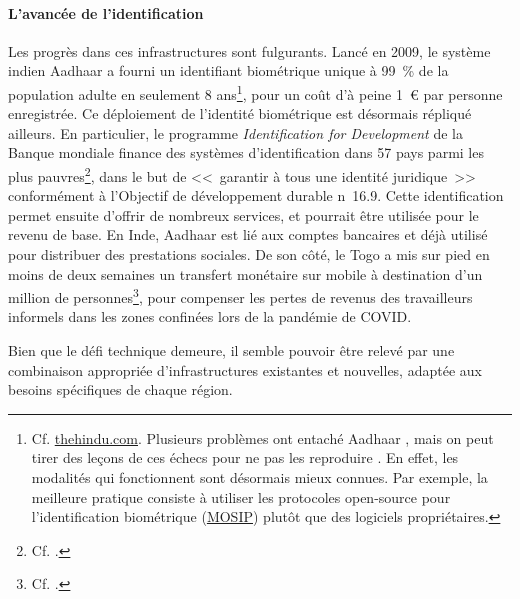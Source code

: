 \documentclass[a5paper,french,openany]{memoir}
\begin{document}
\paragraph{L'avancée de l'identification}
Les progrès dans ces infrastructures sont fulgurants. Lancé en 2009, le système indien Aadhaar a fourni un identifiant biométrique unique à 99~\% de la population adulte en seulement 8 ans\footnote{Cf. \href{https://www.thehindu.com/business/Aadhaar-covers-99-of-adults-in-India-Prasad/article17104609.ece}{thehindu.com}. 
Plusieurs problèmes ont entaché Aadhaar \citep{dreze_aadhaar_2017}, mais on peut tirer des leçons de ces échecs pour ne pas les reproduire \citep{gelb_digital_2019,muralidharan_identity_2023}. En effet, les modalités qui fonctionnent sont désormais mieux connues. Par exemple, la meilleure pratique consiste à utiliser les protocoles open-source pour l'identification biométrique (\href{https://mosip.io}{MOSIP}) plutôt que des logiciels propriétaires.}, pour un coût d'à peine 1~\euro{} par personne enregistrée. Ce déploiement de l'identité biométrique est désormais répliqué ailleurs. %
En particulier, le programme \textit{Identification for Development} de la Banque mondiale finance des systèmes d'identification dans 57 pays parmi les plus pauvres\footnote{Cf. \cite{world_bank_state_2017,world_bank_benin_2020,world_bank_identification_2022}.}, dans le but de <<~garantir à tous une identité juridique~>> conformément à l'Objectif de développement durable n\textdegree{}~16.9. Cette identification permet ensuite d'offrir de nombreux services, et pourrait être utilisée pour le revenu de base. En Inde, Aadhaar est lié aux comptes bancaires et déjà utilisé pour distribuer des prestations sociales. De son côté, le Togo a mis sur pied en moins de deux semaines un transfert monétaire sur mobile à destination d'un million de personnes\footnote{Cf. \cite{ipa_togos_2021}.}, pour compenser les pertes de revenus des travailleurs informels dans les zones confinées lors de la pandémie de COVID. 

Bien que le défi technique demeure, il semble pouvoir être relevé par une combinaison appropriée d'infrastructures existantes et nouvelles, adaptée aux besoins spécifiques de chaque région. 
\end{document}
